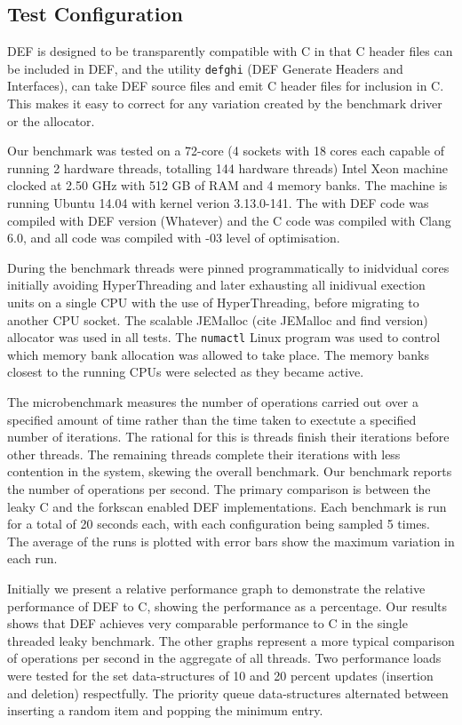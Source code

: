 \subsection{Test Configuration}

DEF is designed to be transparently compatible with C in that C header files can be included in DEF, and the utility \texttt{defghi} (DEF Generate Headers and Interfaces), can take DEF source files and emit C header files for inclusion in C.  This makes it easy to correct for any variation created by the benchmark driver or the allocator.

Our benchmark was tested on a 72-core (4 sockets with 18 cores each capable of running 2 hardware threads, totalling 144 hardware threads) Intel Xeon machine clocked at 2.50 GHz with 512 GB of RAM and 4 memory banks. The machine is running Ubuntu 14.04 with kernel verion 3.13.0-141. The with DEF code was compiled with DEF version (Whatever) and the C code was compiled with Clang 6.0, and all code was compiled with -03 level of optimisation.

During the benchmark threads were pinned programmatically to inidvidual cores initially avoiding HyperThreading and later exhausting all inidivual exection units on a single CPU with the use of HyperThreading, before migrating to another CPU socket. The scalable JEMalloc (cite JEMalloc and find version) allocator was used in all tests. The \texttt{numactl} Linux program was used to control which memory bank allocation was allowed to take place. The memory banks closest to the running CPUs were selected as they became active.

The microbenchmark measures the number of operations carried out over a specified amount of time rather than the time taken to exectute a specified number of iterations. The rational for this is threads finish their iterations before other threads. The remaining threads complete their iterations with less contention in the system, skewing the overall benchmark. Our benchmark reports the number of operations per second. The primary comparison is between the leaky C and the forkscan enabled DEF implementations. Each benchmark is run for a total of 20 seconds each, with each configuration being sampled 5 times. The average of the runs is plotted with error bars show the maximum variation in each run.

Initially we present a relative performance graph to demonstrate the relative performance of DEF to C, showing the performance as a percentage. Our results shows that DEF achieves very comparable performance to C in the single threaded leaky benchmark. The other graphs represent a more typical comparison of operations per second in the aggregate of all threads. Two performance loads were tested for the set data-structures of 10 and 20 percent updates (insertion and deletion) respectfully. The priority queue data-structures alternated between inserting a random item and popping the minimum entry.



